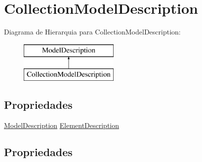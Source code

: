 \hypertarget{classApi3Layers_1_1Areas_1_1HelpPage_1_1ModelDescriptions_1_1CollectionModelDescription}{}\section{Collection\+Model\+Description}
\label{classApi3Layers_1_1Areas_1_1HelpPage_1_1ModelDescriptions_1_1CollectionModelDescription}
Diagrama de Hierarquia para Collection\+Model\+Description\+:\begin{figure}[H]
\begin{center}
\leavevmode
\includegraphics[height=2.000000cm]{classApi3Layers_1_1Areas_1_1HelpPage_1_1ModelDescriptions_1_1CollectionModelDescription}
\end{center}
\end{figure}
\subsection*{Propriedades}
\begin{DoxyCompactItemize}
\item 
\hyperlink{classApi3Layers_1_1Areas_1_1HelpPage_1_1ModelDescriptions_1_1ModelDescription}{Model\+Description} \hyperlink{classApi3Layers_1_1Areas_1_1HelpPage_1_1ModelDescriptions_1_1CollectionModelDescription_a631f3e871530b1038022867696e8c7a9}{Element\+Description}
\end{DoxyCompactItemize}


\subsection{Propriedades}
\mbox{\label{classApi3Layers_1_1Areas_1_1HelpPage_1_1ModelDescriptions_1_1CollectionModelDescription_a631f3e871530b1038022867696e8c7a9}} 
